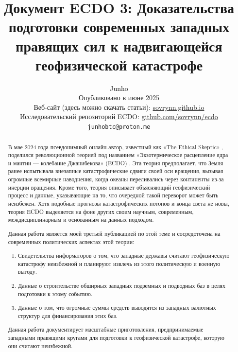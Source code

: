 \documentclass[10pt,twocolumn,letterpaper]{article}
\begin{document}
\title{Документ ECDO 3: Доказательства подготовки современных западных правящих сил к надвигающейся геофизической катастрофе}

\author{Junho\\
Опубликовано в июне 2025\\
Веб-сайт (здесь можно скачать статьи): \href{https://sovrynn.github.io}{sovrynn.github.io}\\
Исследовательский репозиторий ECDO: \href{https://github.com/sovrynn/ecdo}{github.com/sovrynn/ecdo}\\
{\tt\small junhobtc@proton.me}
}

\maketitle

\begin{abstract}
В мае 2024 года псевдонимный онлайн-автор, известный как «The Ethical Skeptic» \cite{0}, поделился революционной теорией под названием «Экзотермическое расцепление ядра и мантии — колебание Джанибекова» (ECDO) \cite{1}. Эта теория предполагает, что Земля ранее испытывала внезапные катастрофические сдвиги своей оси вращения, вызывая огромные всемирные наводнения, когда океаны переливались через континенты из-за инерции вращения. Кроме того, теория описывает объясняющий геофизический процесс и данные, указывающие на то, что очередной такой переворот может быть неизбежен. Хотя подобные прогнозы катастрофических потопов и конца света не новы, теория ECDO выделяется на фоне других своим научным, современным, междисциплинарным и основанным на данных подходом.

Данная работа является моей третьей публикацией \cite{2,3} по этой теме и сосредоточена на современных политических аспектах этой теории:
\begin{flushleft}
\begin{enumerate}
    \item Свидетельства информаторов о том, что западные державы считают геофизическую катастрофу неизбежной и планируют извлечь из этого политическую и военную выгоду.
    \item Данные о строительстве обширных западных подземных и подводных баз в целях подготовки к этому событию.
    \item Данные о том, что огромные суммы средств выводятся из западных валютных структур для финансирования этих баз.
\end{enumerate}
\end{flushleft}

Данная работа документирует масштабные приготовления, предпринимаемые западными правящими кругами для подготовки к геофизической катастрофе, которую они считают неизбежной.
\end{abstract}
\end{document}
